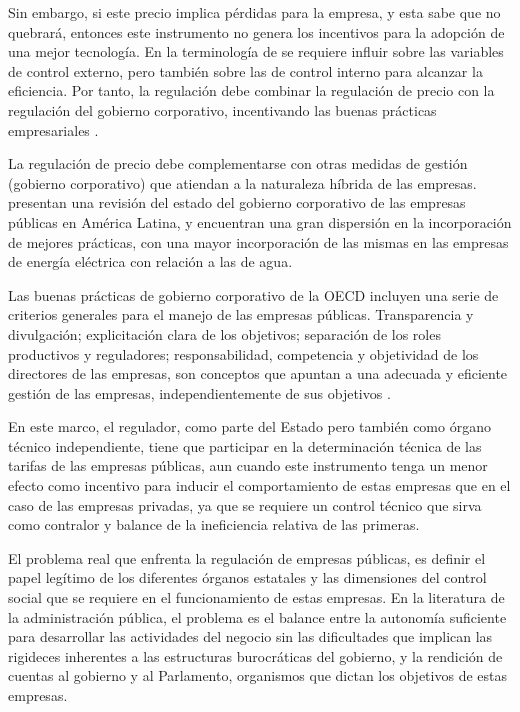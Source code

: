 \documentclass[
  12pt,
  spanish,
]{book}
\begin{document}
Sin embargo, si este precio implica pérdidas para la empresa, y esta
sabe que no quebrará, entonces este instrumento no genera los incentivos
para la adopción de una mejor tecnología. En la terminología de
\citet{Laffont1993} se requiere influir sobre las variables de control
externo, pero también sobre las de control interno para alcanzar la
eficiencia. Por tanto, la regulación debe combinar la regulación de
precio con la regulación del gobierno corporativo, incentivando las
buenas prácticas empresariales \citep{Berg2013}.

La regulación de precio debe complementarse con otras medidas de gestión
(gobierno corporativo) que atiendan a la naturaleza híbrida de las
empresas. \citet{Andres2011} presentan una revisión del estado del
gobierno corporativo de las empresas públicas en América Latina, y
encuentran una gran dispersión en la incorporación de mejores prácticas,
con una mayor incorporación de las mismas en las empresas de energía
eléctrica con relación a las de agua.

Las buenas prácticas de gobierno corporativo de la OECD incluyen una
serie de criterios generales para el manejo de las empresas públicas.
Transparencia y divulgación; explicitación clara de los objetivos;
separación de los roles productivos y reguladores; responsabilidad,
competencia y objetividad de los directores de las empresas, son
conceptos que apuntan a una adecuada y eficiente gestión de las
empresas, independientemente de sus objetivos \citep{OECD2011}.

En este marco, el regulador, como parte del Estado pero también como
órgano técnico independiente, tiene que participar en la determinación
técnica de las tarifas de las empresas públicas, aun cuando este
instrumento tenga un menor efecto como incentivo para inducir el
comportamiento de estas empresas que en el caso de las empresas
privadas, ya que se requiere un control técnico que sirva como contralor
y balance de la ineficiencia relativa de las primeras.

El problema real que enfrenta la regulación de empresas públicas, es
definir el papel legítimo de los diferentes órganos estatales y las
dimensiones del control social que se requiere en el funcionamiento de
estas empresas. En la literatura de la administración pública, el
problema es el balance entre la autonomía suficiente para desarrollar
las actividades del negocio sin las dificultades que implican las
rigideces inherentes a las estructuras burocráticas del gobierno, y la
rendición de cuentas al gobierno y al Parlamento, organismos que dictan
los objetivos de estas empresas.
\end{document}
